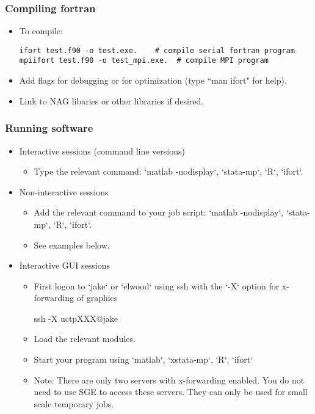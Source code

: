 \documentclass{beamer}
\begin{document}
\begin{frame}[fragile]
\frametitle{Compiling fortran}
\begin{itemize}
\item To compile:
\begin{Verbatim}
ifort test.f90 -o test.exe.    # compile serial fortran program
mpiifort test.f90 -o test_mpi.exe.  # compile MPI program
\end{Verbatim}
\item Add flags for debugging or for optimization (type ``man ifort" for help).
\item Link to NAG libaries or other libraries if desired.
\end{itemize}
\end{frame}

\begin{frame}
\frametitle{Running software}
\begin{itemize}
\item Interactive sessions (command line versions)
\begin{itemize}
\item Type the relevant command: `matlab -nodisplay`, `stata-mp`, `R`, `ifort`.
\end{itemize}
\item Non-interactive sessions
\begin{itemize}
\item Add the relevant command to your job script: `matlab -nodisplay`, `stata-mp`, `R`, `ifort`.
\item See examples below.
\end{itemize}
\item Interactive GUI sessions
\begin{itemize}
\item First logon to `jake` or `elwood` using ssh with the `-X` option for x-forwarding of graphics
\begin{semiverbatim}
ssh -X uctpXXX@jake
\end{semiverbatim}
\item Load the relevant modules.
\item Start your program using `matlab`, `xstata-mp`, `R`, `ifort`
\item Note: There are only two servers with x-forwarding enabled. You do not need to use SGE to access these servers. They can only be used for small scale temporary jobs.
\end{itemize}
\end{itemize}
\end{frame}
\end{document}
